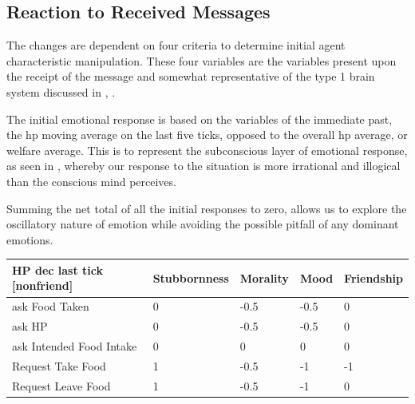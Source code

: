 \subsection{Reaction to Received Messages}
The changes are dependent on four criteria to determine initial agent characteristic manipulation. These four variables are the variables present upon the receipt of the message and somewhat representative of the type 1 brain system discussed in \cite{kahneman_tversky_2000}, \cite{frankish_2010}. \par
The initial emotional response is based on the variables of the immediate past, the hp moving average on the last five ticks, opposed to the overall hp average, or welfare average. This is to represent the subconscious layer of emotional response, as seen in \cite{kamble_2021}, whereby our response to the situation is more irrational and illogical than the conscious mind perceives. \par
Summing the net total of all the initial responses to zero, allows us to explore the oscillatory nature of emotion while avoiding the possible pitfall of any dominant emotions. \par
\begin{table}[htb]
    \centering
    \begin{tabular}{@{}lllll@{}}
    \toprule
    HP dec last tick [nonfriend]    & Stubbornness      & Morality         & Mood             & Friendship     \\ \midrule
    ask Food Taken                  & 0                 & -0.5             & -0.5             & 0              \\
    ask HP                          & 0                 & -0.5             & -0.5             & 0              \\
    ask Intended Food Intake        & 0                 & 0                & 0                & 0              \\
    Request Take Food               & 1                 & -0.5             & -1               & -1             \\
    Request Leave Food              & 1                 & -0.5             & -1               & 0              \\ \bottomrule
    \end{tabular}
\end{table}

